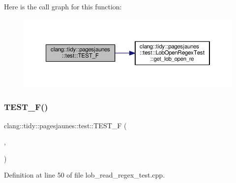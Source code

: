 Here is the call graph for this function\+:
\nopagebreak
\begin{figure}[H]
\begin{center}
\leavevmode
\includegraphics[width=350pt]{namespaceclang_1_1tidy_1_1pagesjaunes_1_1test_aecfb17d2b0da07b94bbe5fcc9eaeccc1_cgraph}
\end{center}
\end{figure}
\mbox{\label{namespaceclang_1_1tidy_1_1pagesjaunes_1_1test_a8901d799343ceabfae305d4a75e028ef}} 
\subsubsection{\texorpdfstring{T\+E\+S\+T\+\_\+\+F()}{TEST\_F()}\hspace{0.1cm}{\footnotesize\ttfamily [15/57]}}
{\footnotesize\ttfamily clang\+::tidy\+::pagesjaunes\+::test\+::\+T\+E\+S\+T\+\_\+F (\begin{DoxyParamCaption}\item[{\hyperlink{classclang_1_1tidy_1_1pagesjaunes_1_1test_1_1_lob_read_regex_test}{Lob\+Read\+Regex\+Test}}]{,  }\item[{Regex\+Matching\+Indicators}]{ }\end{DoxyParamCaption})}



Definition at line 50 of file lob\+\_\+read\+\_\+regex\+\_\+test.\+cpp.

